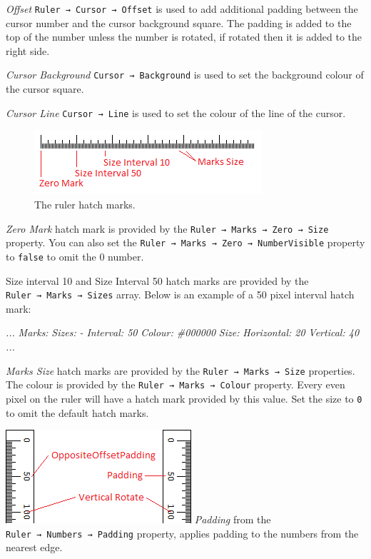 \documentclass[
]{book}
\newenvironment{Shaded}{\begin{snugshade}}{\end{snugshade}}
\newcommand{\CommentTok}[1]{\textcolor[rgb]{0.56,0.35,0.01}{\textit{#1}}}
\begin{document}
\emph{Offset} \texttt{Ruler\ →\ Cursor\ →\ Offset} is used to add additional padding between the cursor number and the cursor background square.
The padding is added to the top of the number unless the number is rotated, if rotated then it is added to the right side.

\emph{Cursor Background} \texttt{Cursor\ →\ Background} is used to set the background colour of the cursor square.

\emph{Cursor Line} \texttt{Cursor\ →\ Line} is used to set the colour of the line of the cursor.

\begin{figure}
\centering
\includegraphics{images/ruler-hashmarks.png}
\caption{\label{fig:unnamed-chunk-10}The ruler hatch marks.}
\end{figure}

\emph{Zero Mark} hatch mark is provided by the \texttt{Ruler\ →\ Marks\ →\ Zero\ →\ Size} property.
You can also set the \texttt{Ruler\ →\ Marks\ →\ Zero\ →\ NumberVisible} property to \texttt{false} to omit the 0 number.

Size interval 10 and Size Interval 50 hatch marks are provided by the \texttt{Ruler\ →\ Marks\ →\ Sizes} array.
Below is an example of a 50 pixel interval hatch mark:

\begin{Shaded}
\begin{Highlighting}[]
\CommentTok{...}
\CommentTok{  Marks:}
\CommentTok{    Sizes:}
\CommentTok{      {-} Interval: 50}
\CommentTok{        Colour: \#000000}
\CommentTok{        Size:}
\CommentTok{          Horizontal: 20}
\CommentTok{          Vertical: 40}
\CommentTok{...}
\end{Highlighting}
\end{Shaded}

\emph{Marks Size} hatch marks are provided by the \texttt{Ruler\ →\ Marks\ →\ Size} properties.
The colour is provided by the \texttt{Ruler\ →\ Marks\ →\ Colour} property.
Every even pixel on the ruler will have a hatch mark provided by this value.
Set the size to \texttt{0} to omit the default hatch marks.

\includegraphics{images/ruler-vertical.png}
\emph{Padding} from the \texttt{Ruler\ →\ Numbers\ →\ Padding} property, applies padding to the numbers from the nearest edge.
\end{document}
